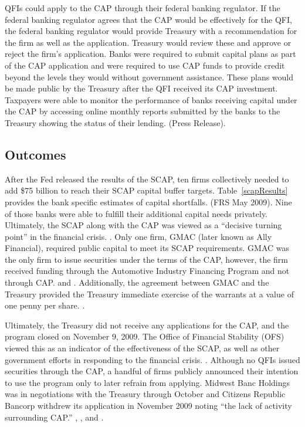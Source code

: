 \documentclass[12pt]{article}
\begin{document}
QFIs could apply to the CAP through their federal banking regulator. If the federal banking regulator agrees that the CAP would be effectively for the QFI, the federal banking regulator would provide Treasury with a recommendation for the firm as well as the application. Treasury would review these and approve or reject the firm's application. Banks were required to submit capital plans as part of the CAP application and were required to use CAP funds to provide credit beyond the levels they would without government assistance. These plans would be made public by the Treasury after the QFI received its CAP investment. Taxpayers were able to monitor the performance of banks receiving capital under the CAP by accessing online monthly reports submitted by the banks to the Treasury showing the status of their lending. (Press Release).


\subsection{Outcomes}

After the Fed released the results of the SCAP, ten firms collectively needed to add \$75 billion to reach their SCAP capital buffer targets. Table~\ref{scapResults} provides the bank specific estimates of capital shortfalls. (FRS May 2009). Nine of those banks were able to fulfill their additional capital needs privately. Ultimately, the SCAP along with the CAP was viewed as a “decisive turning point'' in the financial crisis. \citep{Bernanke}. Only one firm, GMAC (later known as Ally Financial), required public capital to meet its SCAP requirements. GMAC was the only firm to issue securities under the terms of the CAP, however, the firm received funding through the Automotive Industry Financing Program and not through CAP. \citep{OFS} and \citep{GW}. Additionally, the agreement between GMAC and the Treasury provided the Treasury immediate exercise of the warrants at a value of one penny per share. \citep{GW}.



Ultimately, the Treasury did not receive any applications for the CAP, and the program closed on November 9, 2009. The Office of Financial Stability (OFS) viewed this as an indicator of the effectiveness of the SCAP, as well as other government efforts in responding to the financial crisis. \citep{OFS}. Although no QFIs issued securities through the CAP, a handful of firms publicly announced their intention to use the program only to later refrain from applying. Midwest Banc Holdings was in negotiations with the Treasury through October and Citizens Republic Bancorp withdrew its application in November 2009 noting “the lack of activity surrounding CAP.'' \citep{GW}, \citep{Citizens}, and \citep{Midwest}. 
\end{document}
